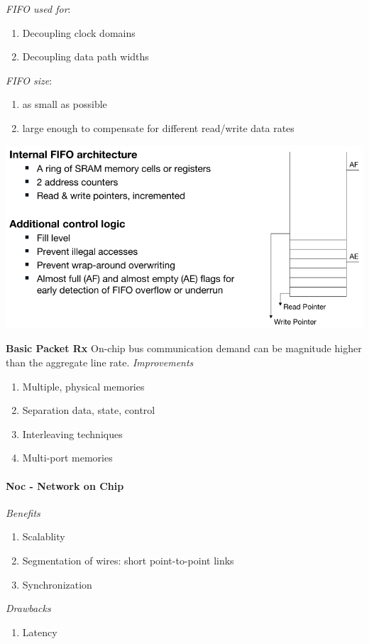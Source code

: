 \documentclass[english]{latex4ei/latex4ei_sheet}
\begin{document}
\textit{FIFO used for}:
\begin{enumerate}
	\item Decoupling clock domains
	\item Decoupling data path widths
\end{enumerate}
\textit{FIFO size}:
\begin{enumerate}
	\item as small as possible
	\item large enough to compensate for different read/write data rates
\end{enumerate}
\begin{center}
	\includegraphics[width=0.75\linewidth]{images//6.Interconnects/FIFO.png}
\end{center}

\textbf{Basic Packet Rx} On-chip bus communication demand can be magnitude higher than the aggregate line rate.
\textit{Improvements}
\begin{enumerate}
	\item Multiple, physical memories
	\item Separation data, state, control
	\item Interleaving techniques
	\item Multi-port memories
\end{enumerate}

\paragraph{Noc - Network on Chip}
\textit{Benefits}
\begin{enumerate}
	\item Scalablity
	\item Segmentation of wires: short point-to-point links
	\item Synchronization
\end{enumerate}
\textit{Drawbacks}
\begin{enumerate}
	\item Latency
\end{enumerate}
\end{document}
